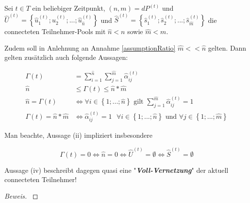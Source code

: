 \begin{Theorem}\label{theremConnectionsCount}

Sei $t \in T$ ein beliebiger Zeitpunkt, $(n, m) = dP^{(t)}$ und $\widehat{U}^{(t)} = \left\{ \widehat{u}^{(t)}_1; \widehat{u}^{(t)}_2;...; \widehat{u}^{(t)}_{\widehat{n}} \right\}$ und $\widehat{S}^{(t)} = \left\{ \widehat{s}^{(t)}_1; \widehat{s}^{(t)}_2;...; \widehat{s}^{(t)}_{\widehat{m}} \right\}$ die connecteten Teilnehmer-Pools mit $\widehat{n} < n$ sowie $\widehat{m} < m$.

Zudem soll in Anlehnung an Annahme \ref{assumptionRatio} $\widehat{m} << \widehat{n}$ gelten. Dann gelten zusätzlich auch folgende Aussagen:

\vspace{0.3cm}

\begin{align*}
\Gamma(t)&= \sum_{i=1}^{\widehat{n}} \sum_{j=1}^{\widehat{m}} \widehat{\alpha}^{(t)}_{ij} \tag{i} \\ 
\widehat{n} &\leq \Gamma(t) \leq \widehat{n} * \widehat{m} \tag{ii} \\
\widehat{n} = \Gamma(t) &\Leftrightarrow \forall i \in \left\{1;...; \widehat{n} \right\}
\textrm{ gilt } \sum_{j=1}^{\widehat{m}} \widehat{\alpha}^{(t)}_{ij} = 1 \tag{iii} \\
\Gamma(t) = \widehat{n} * \widehat{m} &\Leftrightarrow \widehat{\alpha}^{(t)}_{ij} = 1 \textrm{  } \forall i \in \left\{1;...; \widehat{n} \right\} \textrm{ und } \forall j \in \left\{1;...; \widehat{m} \right\} \tag{iv}
\end{align*}

\vspace{0.3cm}

Man beachte, Aussage (ii) impliziert insbesondere

\begin{equation*}
\Gamma(t) = 0 \Leftrightarrow \widehat{n} = 0 \Leftrightarrow \widehat{U}^{(t)} = \emptyset  \Leftrightarrow \widehat{S}^{(t)} = \emptyset
\end{equation*}

\vspace{0.3cm}

Aussage (iv) beschreibt dagegen quasi eine "\textbf{\textit{Voll-Vernetzung}}" der aktuell connecteten Teilnehmer!

\end{Theorem}

\vspace{0.3cm}

\begin{proof}[Beweis] \textrm{ }

\todo{[TODO2][Beweis]}

\end{proof}
\vspace{1cm}



